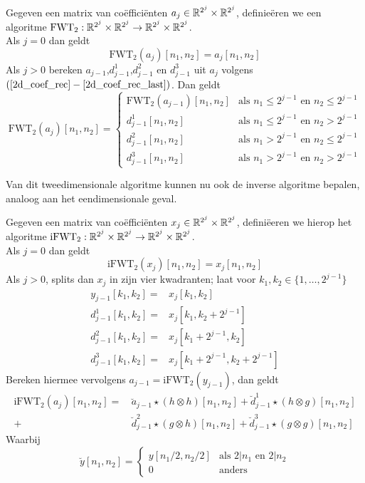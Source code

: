 \begin{algo}
  Gegeven een matrix van co\"effici\"enten $a_j\in\mathbb{R}^{2^j}\times\mathbb{R}^{2^j}$, definie\"eren
  we een algoritme \mbox{$\mathrm{FWT}_2:\mathbb{R}^{2^j}\times\mathbb{R}^{2^j}\to\mathbb{R}^{2^j}\times\mathbb{R}^{2^j}$}.\\
  Als $j=0$ dan geldt
  \[
  \mathrm{FWT}_2(a_j)[n_1,n_2] = a_j[n_1,n_2]
  \]
  Als $j>0$ bereken $a_{j-1}$,$d^1_{j-1}$,$d^2_{j-1}$ en $d^3_{j-1}$ uit $a_{j}$
  volgens $(\eqref{2d_coef_rec}-\eqref{2d_coef_rec_last})$.
  Dan geldt
  \begin{equation}
    \label{FWTd_def}
  \mathrm{FWT}_2(a_j)[n_1,n_2] = \begin{cases}
    \mathrm{FWT}_2(a_{j-1})[n_1,n_2] & \text{als } n_1 \leq 2^{j-1} \text{ en } n_2 \leq 2^{j-1}\\
    d^1_{j-1}[n_1,n_2]
    & \text{als } n_1\leq 2^{j-1} \text{ en } n_2>2^{j-1} \\
    d^2_{j-1}[n_1,n_2]
    & \text{als } n_1>2^{j-1} \text{ en } n_2\leq 2^{j-1} \\
    d^3_{j-1}[n_1,n_2] & \text{als } n_1>2^{j-1} \text{ en } n_2>2^{j-1} \end{cases}
  \end{equation}
\end{algo}
Van dit tweedimensionale algoritme kunnen nu ook de inverse algoritme bepalen, analoog aan het eendimensionale geval.
\begin{algo}
  Gegeven een matrix van  co\"effici\"enten $x_j\in\mathbb{R}^{2^j}\times\mathbb{R}^{2^j}$, defini\"eeren we hierop het
  algoritme \mbox{$\mathrm{iFWT}_2:\mathbb{R}^{2^j}\times\mathbb{R}^{2^j}\to\mathbb{R}^{2^j}\times\mathbb{R}^{2^j}$}.\\
  Als $j=0$ dan geldt
  \[
  \mathrm{iFWT}_2(x_j)[n_1,n_2] = x_j[n_1,n_2]
  \]
  Als $j>0$, splits dan $x_j$ in zijn vier kwadranten; laat voor $k_1,k_2\in \{1,\ldots,2^{j-1}\}$
  \begin{eqnarray*}
    y_{j-1}[k_1,k_2]   =& x_j[k_1,k_2] \\
    d^1_{j-1}[k_1,k_2] =& x_j[k_1,k_2+2^{j-1}] \\
    d^2_{j-1}[k_1,k_2] =& x_j[k_1+2^{j-1},k_2] \\
    d^3_{j-1}[k_1,k_2] =& x_j[k_1+2^{j-1},k_2+2^{j-1}]
  \end{eqnarray*}
  Bereken hiermee vervolgens $a_{j-1} = \mathrm{iFWT}_2(y_{j-1})$,
  dan geldt
  \begin{equation}
    \label{iFWTd_def}
    \begin{split}
      \mathrm{iFWT}_2(a_j)[n_1,n_2] =&\, \breve{a}_{j-1} \star (h \otimes h)[n_1,n_2] 
      + \breve{d}_{j-1}^1 \star (h \otimes g)[n_1,n_2] \\
      +&\, \breve{d}_{j-1}^2 \star (g \otimes h)[n_1,n_2] 
      + \breve{d}_{j-1}^3 \star (g \otimes g)[n_1,n_2]
    \end{split}
  \end{equation}
  Waarbij 
  \[
  \breve y [n_1,n_2] = \begin{cases} 
    y[n_1/2,n_2/2] & \text{als } 2|n_1 \text{ en } 2|n_2 \\ 
    0 &\text{anders}\end{cases}
  \]
\end{algo}
